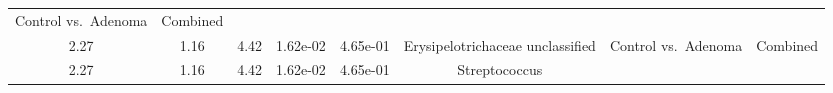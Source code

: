\documentclass[12pt,]{article}
\begin{document}
\begin{longtable}[]{@{}cccccccc@{}}
\begin{minipage}[t]{0.14\columnwidth}
Control vs.~Adenoma\strut
\end{minipage} & \begin{minipage}[t]{0.09\columnwidth}\centering\strut
Combined\strut
\end{minipage}\tabularnewline
\begin{minipage}[t]{0.05\columnwidth}\centering\strut
2.27\strut
\end{minipage} & \begin{minipage}[t]{0.09\columnwidth}\centering\strut
1.16\strut
\end{minipage} & \begin{minipage}[t]{0.09\columnwidth}\centering\strut
4.42\strut
\end{minipage} & \begin{minipage}[t]{0.07\columnwidth}\centering\strut
1.62e-02\strut
\end{minipage} & \begin{minipage}[t]{0.07\columnwidth}\centering\strut
4.65e-01\strut
\end{minipage} & \begin{minipage}[t]{0.20\columnwidth}\centering\strut
Erysipelotrichaceae unclassified\strut
\end{minipage} & \begin{minipage}[t]{0.14\columnwidth}\centering\strut
Control vs.~Adenoma\strut
\end{minipage} & \begin{minipage}[t]{0.09\columnwidth}\centering\strut
Combined\strut
\end{minipage}\tabularnewline
\begin{minipage}[t]{0.05\columnwidth}\centering\strut
2.27\strut
\end{minipage} & \begin{minipage}[t]{0.09\columnwidth}\centering\strut
1.16\strut
\end{minipage} & \begin{minipage}[t]{0.09\columnwidth}\centering\strut
4.42\strut
\end{minipage} & \begin{minipage}[t]{0.07\columnwidth}\centering\strut
1.62e-02\strut
\end{minipage} & \begin{minipage}[t]{0.07\columnwidth}\centering\strut
4.65e-01\strut
\end{minipage} & \begin{minipage}[t]{0.20\columnwidth}\centering\strut
Streptococcus\strut
\end{minipage} & \begin{minipage}[t]{0.14\columnwidth}\centering\strut

\end{minipage}
\end{longtable}
\end{document}
